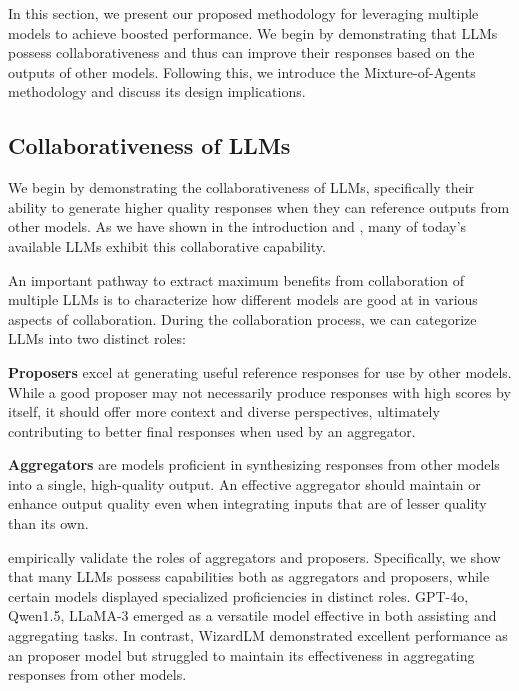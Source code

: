 \documentclass{article}
\begin{document}
In this section, we present our proposed methodology for leveraging multiple models to achieve boosted performance. 
We begin by demonstrating that LLMs possess collaborativeness and thus can improve their responses based on the outputs of other models.
Following this, we introduce the Mixture-of-Agents methodology and discuss its design implications.

\subsection{Collaborativeness of LLMs}

We begin by demonstrating the collaborativeness of LLMs, 
specifically their ability to generate higher quality responses 
when they can reference outputs from other models.
As we have shown in the introduction and , 
many of today's available LLMs exhibit this collaborative capability.

An important pathway to extract maximum benefits from collaboration of multiple LLMs is to characterize how different models are good at in various aspects of collaboration. 
During the collaboration process, we can categorize LLMs into two distinct roles:

\textbf{Proposers} excel at generating useful reference responses for use by other models. 
While a good proposer may not necessarily produce responses with high scores by itself, 
it should offer more context and diverse perspectives, ultimately contributing to better final responses when used by an aggregator.

\textbf{Aggregators} are models proficient in synthesizing responses from other models into a single, high-quality output. 
An effective aggregator should maintain or enhance output quality even when integrating inputs that are of lesser quality than its own.


 empirically validate the roles of aggregators and proposers.
Specifically, we show that many LLMs possess capabilities both as aggregators and proposers,
while certain models displayed specialized proficiencies in distinct roles.
GPT-4o, Qwen1.5, LLaMA-3 emerged as a versatile model effective in both assisting and aggregating tasks.
In contrast, WizardLM demonstrated excellent performance as an proposer model 
but struggled to maintain its effectiveness in aggregating responses from other models.
\end{document}
